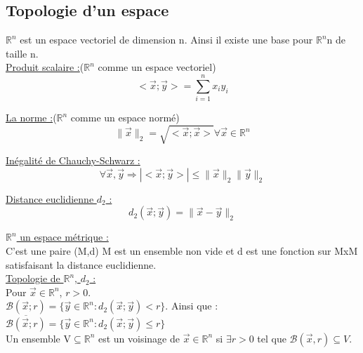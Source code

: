\documentclass[../main.tex]{subfiles}
\begin{document}
\localtableofcontents
\subsection{Topologie d'un espace}
$\mathbb{R}^n$ est un espace vectoriel de dimension n. Ainsi il existe une base pour $\mathbb{R}^n$n de taille n.\\

\quad \underline{Produit scalaire :}($\mathbb{R}^n$ comme un espace vectoriel)\\
\begin{equation}
    <\vec{x}; \vec{y}> = \sum_{i=1}^n x_iy_i
\end{equation}

\quad \underline{La norme :}($\mathbb{R}^n$ comme un espace normé)\\
 \begin{equation}
     \parallel \vec{x}\parallel_2 = \sqrt{<\vec{x}; \vec{x}>} \forall \vec{x} \in \mathbb{R}^n
\end{equation}

\quad \underline{Inégalité de Chauchy-Schwarz :}\\
\begin{equation}
    \forall \vec{x}, \vec{y} \Rightarrow |<\vec{x}; \vec{y}>| \leq \parallel \vec{x}\parallel_2 \parallel \vec{y}\parallel_2
\end{equation}

\quad \underline{Distance euclidienne $d_2$ :}\\
\begin{equation}
    d_2(\vec{x}; \vec{y}) = \parallel \vec{x}-\vec{y}\parallel_2
\end{equation}

\quad \underline{$\mathbb{R}^n$ un espace métrique :}\\
C'est une paire (M,d) M est un ensemble non vide et d est une fonction sur MxM satisfaisant la distance euclidienne.\\

\quad \underline{Topologie de $\mathbb{R}^n$, $d_2$ :}\\
Pour $\vec{x} \in \mathbb{R}^n$, $r>0$. \\
$\mathcal{B}(\vec{x}; r) = \{\vec{y} \in \mathbb{R}^n : d_2(\vec{x}; \vec{y}) < r\}$. Ainsi que : $\overline{\mathcal{B}(\vec{x}; r)} = \{\vec{y} \in \mathbb{R}^n : d_2(\vec{x}; \vec{y}) \leq r\}$\\

Un ensemble V$\subseteq \mathbb{R}^n$ est un voisinage de $\vec{x} \in \mathbb{R}^n$ si $\exists r>0$ tel que $\mathcal{B}(\vec{x}, r) \subseteq V$.\\
\end{document}
